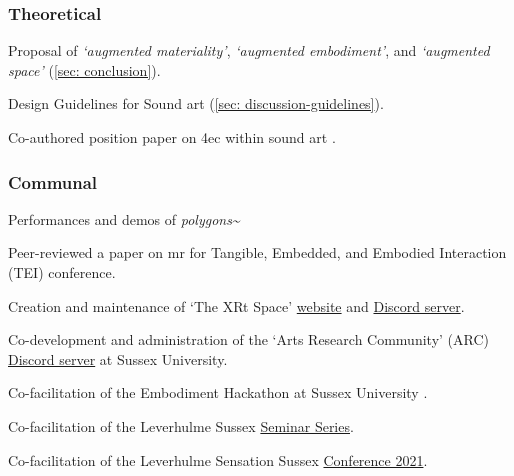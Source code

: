\begin{SingleSpace}
    \subsubsection{Theoretical}
    \begin{noitemize}
        \item Proposal of \textit{`augmented materiality'}, \textit{`augmented embodiment'}, and \textit{`augmented space'} (\autoref{sec: conclusion}).
        \item Design Guidelines for Sound \gls{art} (\autoref{sec: discussion-guidelines}).
        \item Co-authored position paper on \gls{4ec} within sound \gls{art} \citep{bilbow2021}.
    \end{noitemize}
\subsubsection{Communal}
    \begin{noitemize}
        \item Performances and demos of \textit{polygons\textasciitilde{}} \citep{bilbow2022b,bilbow2022a}
        \item Peer-reviewed a paper on \gls{mr} for Tangible, Embedded, and Embodied Interaction (TEI) conference.
        \item Creation and maintenance of `The XRt Space' \href{https://sambilbow.github.io/thexrtspace}{website} and \href{https://discord.gg/p3MmURSBV3}{Discord server}.
        \item Co-development and administration of the `Arts Research Community' (ARC) \href{https://discord.gg/8dfsZDgwN8}{Discord server} at Sussex University. 
        \item Co-facilitation of the Embodiment Hackathon at Sussex University \citep{bonarjee2022}.
        \item Co-facilitation of the Leverhulme Sussex \href{https://www.sussex.ac.uk/sensation/training/seminars}{Seminar Series}.
        \item Co-facilitation of the Leverhulme Sensation Sussex \href{https://www.sussex.ac.uk/sensation/training/conference-2021}{Conference 2021}.
    \end{noitemize}
\end{SingleSpace}




